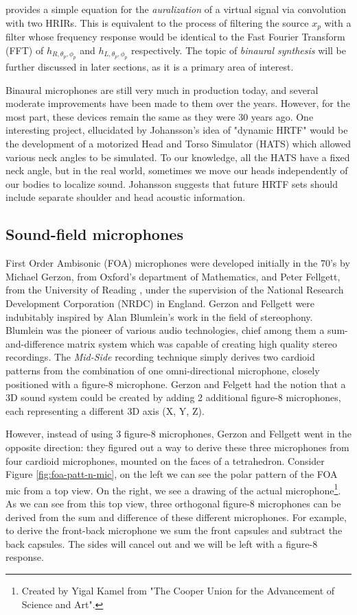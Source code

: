 \cite{hacihabiboglu2017perceptual} provides a simple equation for the \textit{auralization} of a virtual signal via convolution with two HRIRs. This is equivalent to the process of filtering the source $x_p$ with a filter whose frequency response would be identical to the Fast Fourier Transform (FFT) of $h_{R, \theta_{p}, \phi_{p}}$ and $h_{L, \theta_{p}, \phi_{p}}$ respectively. The topic of \textit{binaural synthesis} will be further discussed in later sections, as it is a primary area of interest.

Binaural microphones are still very much in production today, and several moderate improvements have been made to them over the years. However, for the most part, these devices remain the same as they were 30 years ago. One interesting project, ellucidated by Johansson's \cite{johansson2019vr} idea of "dynamic HRTF" would be the development of a motorized Head and Torso Simulator (HATS) which allowed various neck angles to be simulated. To our knowledge, all the HATS have a fixed neck angle, but in the real world, sometimes we move our heads independently of our bodies to localize sound. Johansson suggests that future HRTF sets should include separate shoulder and head acoustic information.

\subsection{Sound-field microphones}

First Order Ambisonic (FOA) microphones were developed initially in the 70's by Michael Gerzon, from Oxford's department of Mathematics, and Peter Fellgett, from the University of Reading \cite{elen1991whatever}, under the supervision of the National Research Development Corporation (NRDC) in England. Gerzon and Fellgett were indubitably inspired by Alan Blumlein's work in the field of stereophony. Blumlein was the pioneer of various audio technologies, chief among them a sum-and-difference matrix system which was capable of creating high quality stereo recordings. The \textit{Mid-Side} recording technique simply derives two cardioid patterns from the combination of one omni-directional microphone, closely positioned with a figure-8 microphone. Gerzon and Felgett had the notion that a 3D sound system could be created by adding 2 additional figure-8 microphones, each representing a different 3D axis (X, Y, Z). 

However, instead of using 3 figure-8 microphones, Gerzon and Fellgett went in the opposite direction: they figured out a way to derive these three microphones from four cardioid microphones, mounted on the faces of a tetrahedron. Consider Figure \ref{fig:foa-patt-n-mic}, on the left we can see the polar pattern of the FOA mic from a top view. On the right, we see a drawing of the actual microphone\footnote{Created by Yigal Kamel from "The Cooper Union for the Advancement of Science and Art".}. As we can see from this top view, three orthogonal figure-8 microphones can be derived from the sum and difference of these different microphones. For example, to derive the front-back microphone we sum the front capsules and subtract the back capsules. The sides will cancel out and we will be left with a figure-8 response. 


